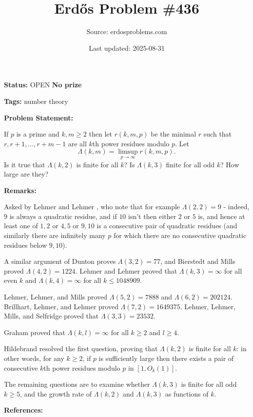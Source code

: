 \documentclass{article}
\title{Erd\H{o}s Problem \#436}
\date{Last updated: 2025-08-31}
\author{Source: erdosproblems.com}
\begin{document}
\maketitle

\noindent\textbf{Status:} OPEN \quad \textbf{No prize}

\noindent\textbf{Tags:} number theory

\medskip
\noindent\textbf{Problem Statement:}

If $p$ is a prime and $k,m\geq 2$ then let $r(k,m,p)$ be the minimal $r$ such that $r,r+1,\ldots,r+m-1$ are all $k$th power residues modulo $p$. Let\[\Lambda(k,m)=\limsup_{p\to \infty} r(k,m,p).\]Is it true that $\Lambda(k,2)$ is finite for all $k$? Is $\Lambda(k,3)$ finite for all odd $k$? How large are they?

\bigskip
\noindent\textbf{Remarks:}

Asked by Lehmer and Lehmer \cite{LeLe62}, who note that for example $\Lambda(2,2)=9$ - indeed, $9$ is always a quadratic residue, and if $10$ isn't then either $2$ or $5$ is, and hence at least one of $1,2$ or $4,5$ or $9,10$ is a consecutive pair of quadratic residues (and similarly there are infinitely many $p$ for which there are no consecutive quadratic residues below $9,10$).

A similar argument of Dunton \cite{Du65} proves $\Lambda(3,2)=77$, and Bierstedt and Mills \cite{BiMi63} proved $\Lambda(4,2)=1224$. Lehmer and Lehmer proved that $\Lambda(k,3)=\infty$ for all even $k$ and $\Lambda(k,4)=\infty$ for all $k\leq 1048909$.

Lehmer, Lehmer, and Mills \cite{LLM63} proved $\Lambda(5,2)=7888$ and $\Lambda(6,2)=202124$. Brillhart, Lehmer, and Lehmer \cite{BLL64} proved $\Lambda(7,2)=1649375$. Lehmer, Lehmer, Mills, and Selfridge \cite{LLMS62} proved that $\Lambda(3,3)=23532$. 

Graham \cite{Gr64g} proved that $\Lambda(k,l)=\infty$ for all $k\geq 2$ and $l\geq 4$.

Hildebrand \cite{Hi91} resolved the first question, proving that $\Lambda(k,2)$ is finite for all $k$: in other words, for any $k\geq 2$, if $p$ is sufficiently large then there exists a pair of consecutive $k$th power residues modulo $p$ in $[1,O_k(1)]$.

The remaining questions are to examine whether $\Lambda(k,3)$ is finite for all odd $k\geq 5$, and the growth rate of $\Lambda(k,2)$ and $\Lambda(k,3)$ as functions of $k$.

\bigskip
\noindent\textbf{References:}
\end{document}
